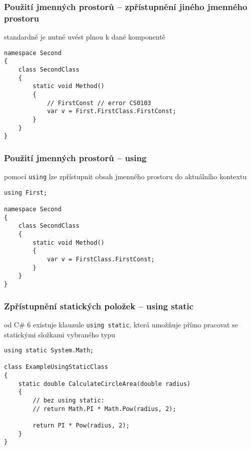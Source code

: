 \begin{frame}[fragile]
\frametitle{Použití jmenných prostorů -- zpřístupnění jiného jmenného prostoru}
\vfill
\begin{bitemize}{}
\item standardně je nutné uvést plnou  k dané komponentě
\end{bitemize}
\vfill
\begin{yesblock}
\begin{lstlisting}
namespace Second
{
    class SecondClass
    {
        static void Method()
        {
            // FirstConst // error CS0103
            var v = First.FirstClass.FirstConst;
        }
    }
}
\end{lstlisting}
\end{yesblock}
\vfill
\end{frame}




\begin{frame}[fragile]
\frametitle{Použití jmenných prostorů -- using}
\vfill
\begin{bitemize}{}
\item pomocí \lstinline|using| lze zpřístupnit obsah jmenného prostoru do aktuálního kontextu
\end{bitemize}
\vfill
\begin{yesblock}
\begin{lstlisting}
using First;

namespace Second
{
    class SecondClass
    {
        static void Method()
        {
            var v = FirstClass.FirstConst;
        }
    }
}
\end{lstlisting}
\end{yesblock}
\vfill
\end{frame}






\begin{frame}[fragile]
\frametitle{Zpřístupnění statických položek -- using static}
\vfill
\begin{bitemize}{}
\item od C\# 6 existuje klauzule \lstinline|using static|, která umožňuje přímo pracovat se statickými složkami vybraného typu
\end{bitemize}
\vfill
\begin{yesblock}
\begin{lstlisting}
using static System.Math;

class ExampleUsingStaticClass
{
    static double CalculateCircleArea(double radius)
    {
        // bez using static:
        // return Math.PI * Math.Pow(radius, 2);
        
        return PI * Pow(radius, 2);
    }
}
\end{lstlisting}
\end{yesblock}
\vfill
\end{frame}